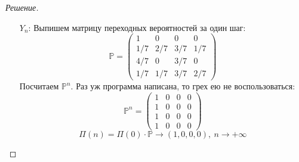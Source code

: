 \documentclass[12pt,a4paper]{extarticle}
\newcommand{\ra}{\rightarrow}
\begin{document}
\begin{proof} [Решение]
\begin{itemize}
			Получилось:
			\[
			\mathbb{P}^n=
				\begin{pmatrix}
					1/4 & 1/4 & 1/4 & 1/4
					\\
					1/4 & 1/4 & 1/4 & 1/4
					\\
					1/4 & 1/4 & 1/4 & 1/4
					\\					
					1/4 & 1/4 & 1/4 & 1/4
				\end{pmatrix}
			\]
			
			Тогда:
			\[
				\Pi(n) = \Pi(0) \cdot \mathbb{P} \ra (1/4, 1/4, 1/4, 1/4), ~n\ra +\infty 
			\]
			\\
			\item[$Y_n$:] Выпишем матрицу переходных вероятностей за один шаг:
			\[
				\mathbb{P}=
				\begin{pmatrix}
					1 & 0 & 0 & 0
					\\
					1/7 & 2/7 & 3/7 & 1/7
					\\
					4/7 & 0 & 3/7 & 0
					\\
					1/7 & 1/7 & 3/7 & 2/7
				\end{pmatrix}
			\]
			Посчитаем $\mathbb{P}^n$. Раз уж программа написана, то грех ею не воспользоваться:
						\[
			\mathbb{P}^n=
				\begin{pmatrix}
					1 & 0 & 0 & 0
					\\
					1 & 0 & 0 & 0
					\\
					1 & 0 & 0 & 0
					\\
					1 & 0 & 0 & 0
				\end{pmatrix}
			\]
						\[
			\Pi(n) = \Pi(0) \cdot \mathbb{P} \ra (1, 0, 0, 0), ~n\ra +\infty 
			\]
		\end{itemize}
	\end{proof}
	
	
	
	
	
	
	
	
	
	
	
	\vspace{\baselineskip}
	
\end{document}
